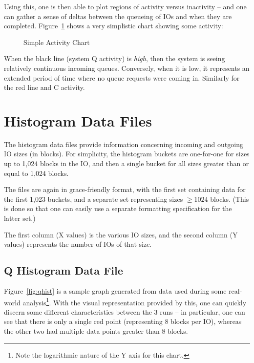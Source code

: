 \documentclass{article}
\begin{document}
  Using this, one is then able to plot regions of activity versus
  inactivity -- and one can gather a sense of deltas between the queueing
  of IOs and when they are completed. Figure~\ref{fig:activity} shows
  a very simplistic chart showing some activity:

  \begin{figure}[hb]
  \leavevmode\centering
  \caption{\label{fig:activity}Simple Activity Chart}
  \end{figure}

  When the black line (system Q activity) is \emph{high}, then the system
  is seeing relatively continuous incoming queues. Conversely, when it is
  low, it represents an extended period of time where no queue requests
  were coming in. Similarly for the red line and C activity.

\newpage\section{\label{sec:hist}Histogram Data Files}

  The histogram data files provide information concerning incoming and
  outgoing IO sizes (in blocks). For simplicity, the histogram buckets
  are one-for-one for sizes up to 1,024 blocks in the IO, and then a
  single bucket for all sizes greater than or equal to 1,024 blocks.

  The files are again in grace-friendly format, with the first set
  containing data for the first 1,023 buckets, and a separate set
  representing sizes $\ge 1024$ blocks. (This is done so that one can
  easily use a separate formatting specification for the latter set.)

  The first column (X values) is the various IO sizes, and the second
  column (Y values) represents the number of IOs of that size.

\subsection{\label{sec:qhist}Q Histogram Data File}

  Figure~\ref{fig:qhist} is a sample graph generated from data used during
  some real-world analysis\footnote{Note the logarithmic nature of the
  Y axis for this chart.}. With the visual representation provided by
  this, one can quickly discern some different characteristics between
  the 3 runs -- in particular, one can see that there is only a single
  red point (representing 8 blocks per IO), whereas the other two had
  multiple data points greater than 8 blocks.
\end{document}
